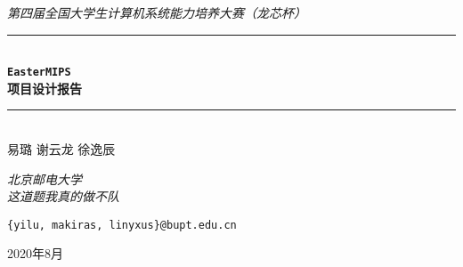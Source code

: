 \documentclass[fontset=fandol]{ctexrep}
\newcommand{\artdate}{2020年8月}
\newcommand{\mailto}[1]{\href{mailto:#1}{\texttt{#1}}}
\begin{document}
\begin{titlepage}

    \newcommand{\HRule}{\rule{\linewidth}{0.5mm}}
  
    \vfill
    \center 
    
    \textit{\large 第四届全国大学生计算机系统能力培养大赛（龙芯杯）}\\[0.5cm] 
  
    \rule{\linewidth}{0.8mm} \\[0.6cm]
    { \Huge \bfseries \texttt{EasterMIPS}}\\[0.4cm]
    { \Large \bfseries  项目设计报告}\\
    \rule{\linewidth}{0.5mm} \\[0.8cm]
   
   
   易璐 \quad 谢云龙 \quad 徐逸辰 \\
   
   \vspace{0.3 cm}
   
   \textit{北京邮电大学 \\
   这道题我真的做不队} \\
   
   \vspace{0.1 cm}
   
   \texttt{\{yilu, makiras, linyxus\}@bupt.edu.cn}\\
  
    
    \vspace{3 cm}
   
    
    \vspace*{\fill}
  
    {\large \artdate}
  
\end{titlepage}

{
\hypersetup{linkcolor=black}
\tableofcontents
}













\end{document}
